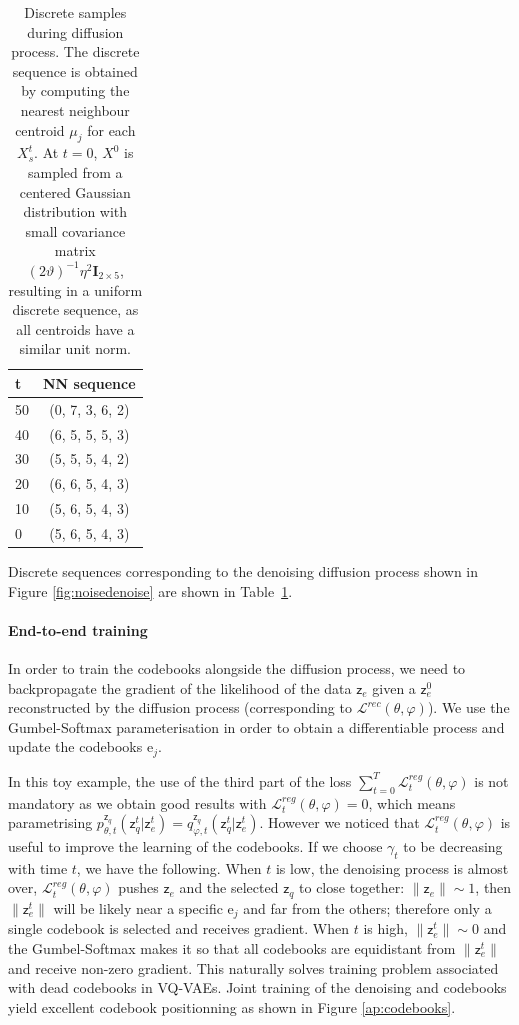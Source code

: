 \documentclass{article}
\theoremstyle{plain}
\theoremstyle{definition}
\theoremstyle{remark}
\newcommand{\latentcont}{\mathsf{z}_e}
\newcommand{\latentdis}{\mathsf{z}_q}
\newcommand{\rme}{\mathrm{e}}
\newcommand{\embed}{\rme}
\begin{document}
\begin{table}[h!]
    
    \centering
    \begin{tabular}{l|c}
        t & NN sequence \\
        \hline
        50& (0, 7, 3, 6, 2)\\
        40& (6, 5, 5, 5, 3)\\
        30& (5, 5, 5, 4, 2)\\
        20& (6, 6, 5, 4, 3)\\
        10& (5, 6, 5, 4, 3)\\
        0& (5, 6, 5, 4, 3)
    \end{tabular}
    \caption{\label{ap:tab:discretetoy} Discrete samples during diffusion process. The discrete sequence is obtained by computing the nearest neighbour centroid $\mu_j$ for each $X^t_s$. At $t=0$, $X^0$ is sampled from a centered Gaussian distribution with small covariance matrix $(2\vartheta)^{-1}\eta^2\mathbf{I}_{2\times 5}$, resulting in a uniform discrete sequence, as all centroids have a similar unit norm.}

\end{table}


Discrete sequences corresponding to the denoising diffusion process shown in Figure \ref{fig:noisedenoise} are shown in Table~\ref{ap:tab:discretetoy}.

\paragraph{End-to-end training}
\label{ap:end2end}
In order to train the codebooks alongside the diffusion process, we need to backpropagate the gradient of the likelihood of the data $\latentcont$ given a $\latentcont^0$ reconstructed by the diffusion process (corresponding to $\mathcal{L}^{rec}(\theta,\varphi)$). We use the Gumbel-Softmax parameterisation in order to obtain a differentiable process and update the codebooks $\embed_j$.

In this toy example, the use of the third part of the loss $\sum_{t=0}^T \mathcal{L}^{reg}_t(\theta,\varphi)$ is not mandatory as we obtain good results with $\mathcal{L}^{reg}_t(\theta,\varphi) = 0$, which means parametrising $p_{\theta,t}^{\latentdis}(\latentdis^t|\latentcont^t) = q_{\varphi,t}^{\latentdis}(\latentdis^t|\latentcont^t)$. However we noticed that $\mathcal{L}^{reg}_t(\theta,\varphi)$ is useful to improve the learning of the codebooks. If we choose $\gamma_t$ to be decreasing with time $t$, we have the following. When $t$ is low, the denoising process is almost over, $\mathcal{L}^{reg}_t(\theta,\varphi)$ pushes $\latentcont$ and the selected $\latentdis$ to close together: $\|\latentcont\| \sim 1$, then $\|\latentcont^t\|$ will be likely near a specific $\embed_j$ and far from the others; therefore only a single codebook is selected and receives gradient. When $t$ is high, $\|\latentcont^t\| \sim 0$ and the Gumbel-Softmax makes it so that all codebooks are equidistant from $\|\latentcont^t\|$ and receive non-zero gradient. This naturally solves training problem associated with dead codebooks in VQ-VAEs. Joint training of the denoising and codebooks yield excellent codebook positionning as shown in Figure \ref{ap:codebooks}.
\end{document}
